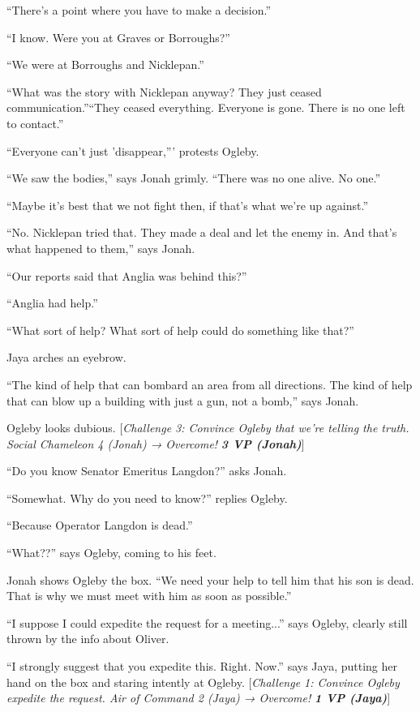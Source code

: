 ``There's a point where you have to make a decision.''

``I know.  Were you at Graves or Borroughs?''

``We were at Borroughs and Nicklepan.''

``What was the story with Nicklepan anyway?  They just ceased communication.''``They ceased everything.  Everyone is gone.  There is no one left to contact.''

``Everyone can't just 'disappear,''' protests Ogleby.

``We saw the bodies,'' says Jonah grimly. ``There was no one alive.  No one.''

``Maybe it's best that we not fight then, if that's what we're up against.''

``No.  Nicklepan tried that.  They made a deal and let the enemy in.  And that's what happened to them,'' says Jonah.

``Our reports said that Anglia was behind this?''

``Anglia had help.''

``What sort of help?  What sort of help could do something like that?''

Jaya arches an eyebrow.

``The kind of help that can bombard an area from all directions.  The kind of help that can blow up a building with just a gun, not a bomb,'' says Jonah.

Ogleby looks dubious.  {[}\textit{Challenge 3: Convince Ogleby that we're telling the truth. Social Chameleon 4 (Jonah) → Overcome! }\textit{\textbf{3 VP (Jonah)}}{]} 



``Do you know Senator Emeritus Langdon?'' asks Jonah.

``Somewhat. Why do you need to know?'' replies Ogleby.

``Because Operator Langdon is dead.''

``What??'' says Ogleby, coming to his feet.

Jonah shows Ogleby the box.  ``We need your help to tell him that his son is dead.  That is why we must meet with him as soon as possible.''

``I suppose I could expedite the request for a meeting...'' says Ogleby, clearly still thrown by the info about Oliver.

``I strongly suggest that you expedite this. Right.  Now.'' says Jaya, putting her hand on the box and staring intently at Ogleby. {[}\textit{Challenge 1: Convince Ogleby expedite the request. Air of   Command 2 (Jaya) → Overcome! }\textit{\textbf{1 VP (Jaya)}}{]} 

